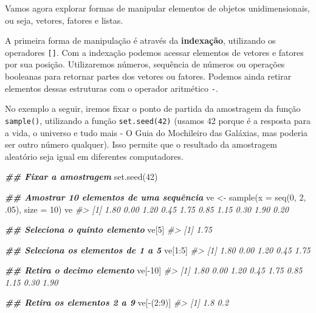 \documentclass[
]{book}
\newenvironment{Shaded}{\begin{snugshade}}{\end{snugshade}}
\newcommand{\AttributeTok}[1]{\textcolor[rgb]{0.61,0.61,0.61}{#1}}
\newcommand{\CommentTok}[1]{\textcolor[rgb]{0.37,0.37,0.37}{\textit{#1}}}
\newcommand{\DecValTok}[1]{\textcolor[rgb]{0.06,0.06,0.06}{#1}}
\newcommand{\DocumentationTok}[1]{\textcolor[rgb]{0.37,0.37,0.37}{\textbf{\textit{#1}}}}
\newcommand{\FunctionTok}[1]{\textcolor[rgb]{0,0,0}{#1}}
\newcommand{\NormalTok}[1]{#1}
\newcommand{\OtherTok}[1]{\textcolor[rgb]{0.37,0.37,0.37}{#1}}
\newcommand{\SpecialCharTok}[1]{\textcolor[rgb]{0,0,0}{#1}}
\begin{document}
Vamos agora explorar formas de manipular elementos de objetos unidimensionais, ou seja, vetores, fatores e listas.

A primeira forma de manipulação é através da \textbf{indexação}, utilizando os operadores \texttt{{[}{]}}. Com a indexação podemos acessar elementos de vetores e fatores por sua posição. Utilizaremos números, sequência de números ou operações booleanas para retornar partes dos vetores ou fatores. Podemos ainda retirar elementos dessas estruturas com o operador aritmético \texttt{-}.

No exemplo a seguir, iremos fixar o ponto de partida da amostragem da função \texttt{sample()}, utilizando a função \texttt{set.seed(42)} (usamos 42 porque é a resposta para a vida, o universo e tudo mais - O Guia do Mochileiro das Galáxias, mas poderia ser outro número qualquer). Isso permite que o resultado da amostragem aleatório seja igual em diferentes computadores.

\begin{Shaded}
\begin{Highlighting}[]
\DocumentationTok{\#\# Fixar a amostragem}
\FunctionTok{set.seed}\NormalTok{(}\DecValTok{42}\NormalTok{)}

\DocumentationTok{\#\# Amostrar 10 elementos de uma sequência}
\NormalTok{ve }\OtherTok{\textless{}{-}} \FunctionTok{sample}\NormalTok{(}\AttributeTok{x =} \FunctionTok{seq}\NormalTok{(}\DecValTok{0}\NormalTok{, }\DecValTok{2}\NormalTok{, .}\DecValTok{05}\NormalTok{), }\AttributeTok{size =} \DecValTok{10}\NormalTok{)}
\NormalTok{ve}
\CommentTok{\#\textgreater{}  [1] 1.80 0.00 1.20 0.45 1.75 0.85 1.15 0.30 1.90 0.20}

\DocumentationTok{\#\# Seleciona o quinto elemento}
\NormalTok{ve[}\DecValTok{5}\NormalTok{]}
\CommentTok{\#\textgreater{} [1] 1.75}

\DocumentationTok{\#\# Seleciona os elementos de 1 a 5}
\NormalTok{ve[}\DecValTok{1}\SpecialCharTok{:}\DecValTok{5}\NormalTok{]}
\CommentTok{\#\textgreater{} [1] 1.80 0.00 1.20 0.45 1.75}

\DocumentationTok{\#\# Retira o decimo elemento}
\NormalTok{ve[}\SpecialCharTok{{-}}\DecValTok{10}\NormalTok{]}
\CommentTok{\#\textgreater{} [1] 1.80 0.00 1.20 0.45 1.75 0.85 1.15 0.30 1.90}

\DocumentationTok{\#\# Retira os elementos 2 a 9}
\NormalTok{ve[}\SpecialCharTok{{-}}\NormalTok{(}\DecValTok{2}\SpecialCharTok{:}\DecValTok{9}\NormalTok{)]}
\CommentTok{\#\textgreater{} [1] 1.8 0.2}
\end{Highlighting}
\end{Shaded}
\end{document}

